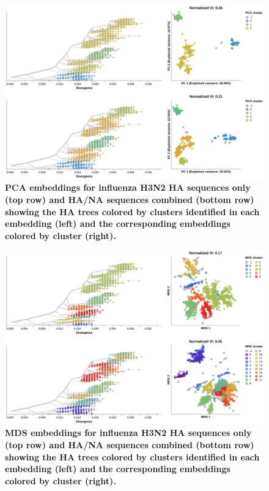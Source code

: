 \begin{figure}[!h]
\includegraphics[width=\columnwidth]{figures/flu-2016-2018-ha-na-pca-by-cluster.png}
\caption{{\bf PCA embeddings for influenza H3N2 HA sequences only (top row) and HA/NA sequences combined (bottom row) showing the HA trees colored by clusters identified in each embedding (left) and the corresponding embeddings colored by cluster (right).}}\label{S_Fig_flu_ha_na_pca_embeddings}
\end{figure}

\begin{figure}[!h]
\includegraphics[width=\columnwidth]{figures/flu-2016-2018-ha-na-mds-by-cluster.png}
\caption{{\bf MDS embeddings for influenza H3N2 HA sequences only (top row) and HA/NA sequences combined (bottom row) showing the HA trees colored by clusters identified in each embedding (left) and the corresponding embeddings colored by cluster (right).}}\label{S_Fig_flu_ha_na_mds_embeddings}
\end{figure}

